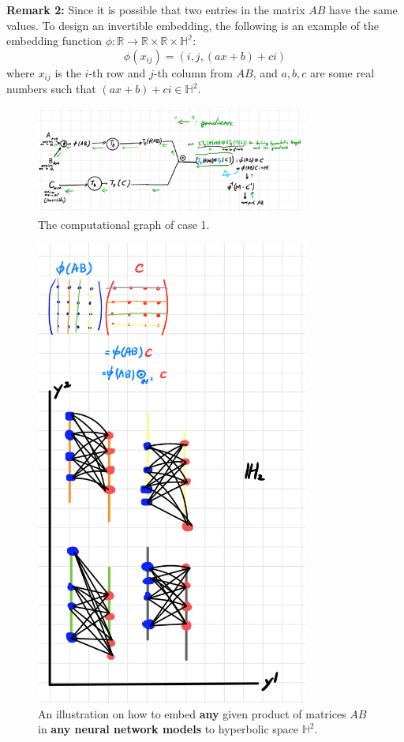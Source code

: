 \documentclass{article}
\theoremstyle{plain}
\theoremstyle{plain} %
\theoremstyle{definition}  %
\theoremstyle{remark}  %
\theoremstyle{plain}
\begin{document}
\textbf{Remark 2:} Since it is possible that two entries in the matrix $AB$ have the same values. To design an invertible embedding, the following is an example of the embedding function $\phi: \mathbb{R}\to \mathbb{R\times \mathbb{R}\times \mathbb{H}^2}$:
$$
\phi(x_{ij})=(i,j,(ax+b)+ci)
$$
where $x_{ij}$ is the $i$-th row and $j$-th column from $AB$, and $a,b,c$ are some real numbers such that $(ax+b)+ci\in\mathbb{H}^2$.
\begin{figure}[H]
\centering
\includegraphics[width=0.8\textwidth]{8.png}
\caption{The computational graph of case 1.}
\end{figure}

\begin{figure}[H]
\centering
\includegraphics[width=0.8\textwidth]{9.png}
\caption{An illustration on how to embed \textbf{any} given product of matrices $AB$ in \textbf{any neural network models} to hyperbolic space $\mathbb{H}^2$.}
\end{figure}
\end{document}
